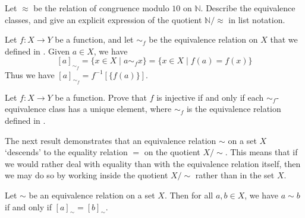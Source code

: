 \begin{exercise}
Let $\approx$ be the relation of congruence modulo $10$ on $\mathbb{N}$. Describe the equivalence classes, and give an explicit expression of the quotient $\mathbb{N}/{\approx}$ in list notation.
\end{exercise}

\begin{example}
Let $f : X \to Y$ be a function, and let $\sim_f$ be the equivalence relation on $X$ that we defined in . Given $a \in X$, we have
\[ [a]_{\sim_f} = \{ x \in X \mid a \sim_f x \} = \{ x \in X \mid f(a) = f(x) \} \]
Thus we have $[a]_{\sim_f} = f^{-1}[\{ f(a) \}]$.
\end{example}

\begin{exercise}
Let $f : X \to Y$ be a function. Prove that $f$ is injective if and only if each $\sim_f$-equivalence class has a unique element, where $\sim_f$ is the equivalence relation defined in .
\end{exercise}

The next result demonstrates that an equivalence relation $\sim$ on a set $X$ `descends' to the equality relation $=$ on the quotient $X/{\sim}$. This means that if we would rather deal with equality than with the equivalence relation itself, then we may do so by working inside the quotient $X/{\sim}$ rather than in the set $X$.

\begin{theorem}
\label{thmEquivalenceRelationDescendsToEqualityOnQuotient}
Let $\sim$ be an equivalence relation on a set $X$. Then for all $a,b \in X$, we have $a \sim b$ if and only if $[a]_{\sim} = [b]_{\sim}$.
\end{theorem}

